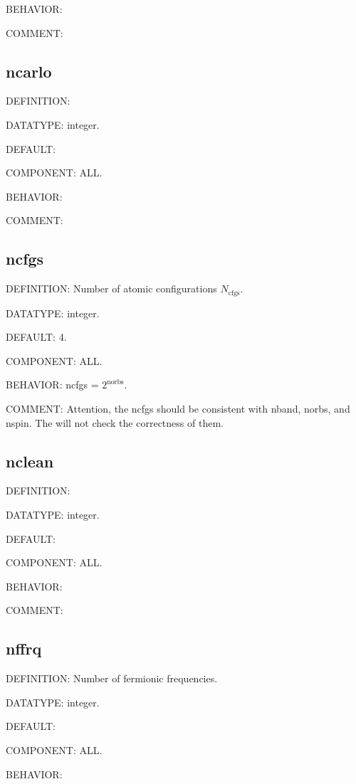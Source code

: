{\color{purple}BEHAVIOR:}

{\color{olive}COMMENT:}

\subsection{ncarlo}
{\color{red}DEFINITION:}

{\color{green}DATATYPE:} integer.

{\color{blue}DEFAULT:}

{\color{brown}COMPONENT:} ALL.

{\color{purple}BEHAVIOR:}

{\color{olive}COMMENT:}

\subsection{ncfgs}
{\color{red}DEFINITION:} Number of atomic configurations $N_{\text{cfgs}}$.

{\color{green}DATATYPE:} integer.

{\color{blue}DEFAULT:} 4.

{\color{brown}COMPONENT:} ALL.

{\color{purple}BEHAVIOR:} ncfgs = $2^{\text{norbs}}$.

{\color{olive}COMMENT:} Attention, the ncfgs should be consistent with nband, norbs, and nspin. The {\iqist} will not check the 
correctness of them.

\subsection{nclean}
{\color{red}DEFINITION:}

{\color{green}DATATYPE:} integer.

{\color{blue}DEFAULT:}

{\color{brown}COMPONENT:} ALL.

{\color{purple}BEHAVIOR:}

{\color{olive}COMMENT:}

\subsection{nffrq}
{\color{red}DEFINITION:} Number of fermionic frequencies.

{\color{green}DATATYPE:} integer.

{\color{blue}DEFAULT:}

{\color{brown}COMPONENT:} ALL.

{\color{purple}BEHAVIOR:}


